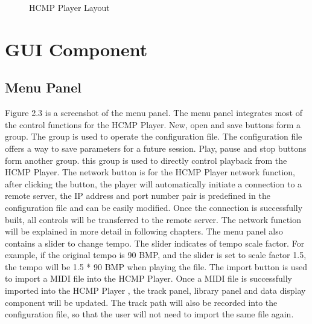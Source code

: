\begin{figure}[H]
\caption{HCMP Player Layout}
\label{fig:speciation}
\end{figure}

\section{GUI Component}

\subsection{Menu Panel}

Figure 2.3 is a screenshot of the menu panel. The menu panel integrates most of the control 
functions for the HCMP Player. New, open and save buttons form a group. The group is used to 
operate the configuration file. The configuration file offers a way to save parameters for a
future session. Play, pause and stop buttons form another group. 
this group is used to directly control playback from the HCMP Player.
The network button is for the HCMP Player  
network function, after clicking the button, the player will automatically 
initiate a connection to a remote server, the IP address and port number pair is 
predefined in the configuration file and can be easily modified. Once the connection is 
successfully built, all controls will be transferred to the remote server. 
The network function will be explained in more detail in following
chapters. The menu panel also contains a slider to change 
tempo. The slider indicates of tempo scale factor. For example, 
if the original tempo is 90 BMP, and the slider is set to scale factor 1.5, 
the tempo will be 1.5 * 90 
BMP when playing the file. The import button is used to import a MIDI file 
into the HCMP Player. Once a MIDI file is successfully imported into the HCMP Player  
, the track panel, library panel and data display component will be updated.
The track path will also be recorded into the configuration file, so that the user 
will not need to import the same file again.

